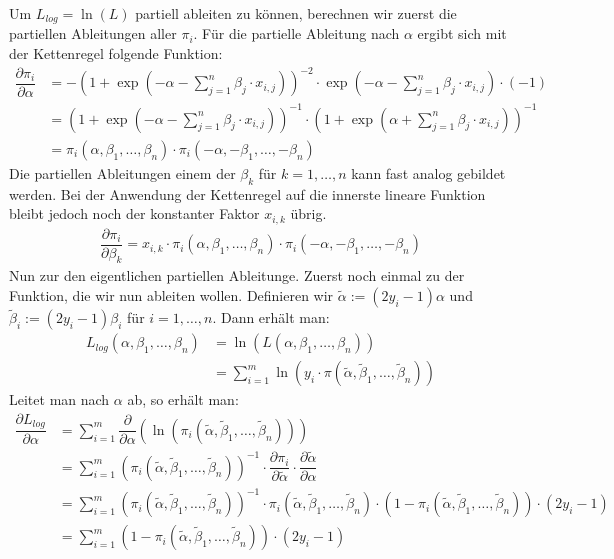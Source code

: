 Um $L_{log} = \ln(L)$ partiell ableiten zu können, berechnen wir zuerst die partiellen Ableitungen aller $\pi_i$. Für die partielle Ableitung nach $\alpha$ ergibt sich mit der Kettenregel folgende Funktion:
\begin{align*}
    \dfrac{\partial \pi_i}{\partial \alpha} &= - \left( 1 + \exp \left(- \alpha - \sum_{j=1}^n \beta_j \cdot x_{i, j} \right) \right)^{-2} \cdot \exp \left(- \alpha - \sum_{j=1}^n \beta_j \cdot x_{i, j} \right) \cdot (-1) \\
    &= \left( 1 + \exp \left(- \alpha - \sum_{j=1}^n \beta_j \cdot x_{i, j} \right) \right)^{-1} \cdot \left( 1 + \exp \left(\alpha + \sum_{j=1}^n \beta_j \cdot x_{i, j} \right) \right)^{-1} \\
    &= \pi_i(\alpha, \beta_1, \dots, \beta_n) \cdot \pi_i(- \alpha, - \beta_1, \dots, - \beta_n)
\end{align*}
Die partiellen Ableitungen einem der $\beta_k$ für $k = 1, \dots, n$ kann fast analog gebildet werden. Bei der Anwendung der Kettenregel auf die innerste lineare Funktion bleibt jedoch noch der konstanter Faktor $x_{i, k}$ übrig.
\begin{align*}
    \dfrac{\partial \pi_i}{\partial \beta_k} = x_{i, k} \cdot \pi_i(\alpha, \beta_1, \dots, \beta_n) \cdot \pi_i(- \alpha, - \beta_1, \dots, - \beta_n)
\end{align*}
Nun zur den eigentlichen partiellen Ableitunge. Zuerst noch einmal zu der Funktion, die wir nun ableiten wollen. Definieren wir $\tilde\alpha := (2 y_i - 1) \alpha$ und $\tilde\beta_i := (2 y_i - 1) \beta_i$ für $i = 1, \dots, n$. Dann erhält man:
\begin{align*}
    L_{log}(\alpha, \beta_1, \dots, \beta_n) &= \ln(L(\alpha, \beta_1, \dots, \beta_n)) \\
    &= \sum_{i=1}^m \ln \left(y_i \cdot \pi(\tilde\alpha, \tilde\beta_1, \dots, \tilde\beta_n) \right)
\end{align*}
Leitet man nach $\alpha$ ab, so erhält man:
\begin{align*}
    \dfrac{\partial L_{log}}{\partial \alpha} &= \sum_{i=1}^m \dfrac{\partial}{\partial \alpha} \left( \ln \left( \pi_i(\tilde\alpha, \tilde\beta_1, \dots, \tilde\beta_n) \right) \right) \\
    &= \sum_{i=1}^m \left( \pi_i(\tilde\alpha, \tilde\beta_1, \dots, \tilde\beta_n) \right)^{-1} \cdot \dfrac{\partial \pi_i}{\partial \tilde\alpha} \cdot \dfrac{\partial \tilde\alpha}{\partial \alpha} \\
    &= \sum_{i=1}^m \left( \pi_i(\tilde\alpha, \tilde\beta_1, \dots, \tilde\beta_n) \right)^{-1} \cdot \pi_i(\tilde\alpha, \tilde\beta_1, \dots, \tilde\beta_n) \cdot (1 - \pi_i(\tilde\alpha, \tilde\beta_1, \dots, \tilde\beta_n)) \cdot (2 y_i - 1) \\
    &= \sum_{i=1}^m (1 - \pi_i(\tilde\alpha, \tilde\beta_1, \dots, \tilde\beta_n)) \cdot (2 y_i - 1)
\end{align*}
